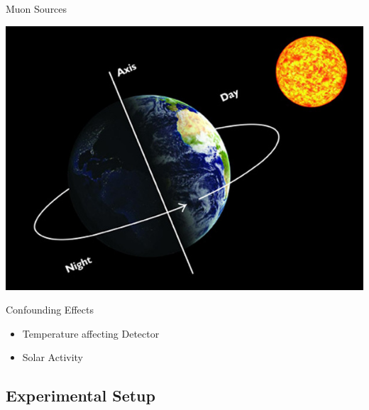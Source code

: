 \documentclass{beamer}
\begin{document}
\begin{frame}{Muon Sources}
\begin{center}
\includegraphics[scale=.25]{../Figures/dayNight.jpg}
\end{center}
\end{frame}


\begin{frame}{Confounding Effects}
\begin{itemize}
	\item Temperature affecting Detector
	\item Solar Activity
\end{itemize}
\end{frame}

\subsection{Experimental Setup}
\end{document}
